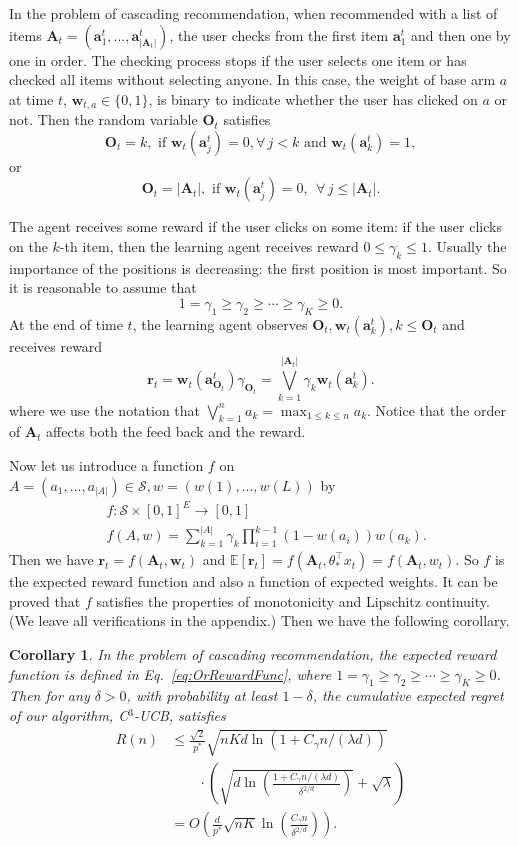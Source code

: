 \documentclass{article}
\newcommand{\EE}{\mathbb{E}}
\newcommand{\bA}{\mathbf{A}}
\newcommand{\ba}{\mathbf{a}}
\newcommand{\bO}{\mathbf{O}}
\newcommand{\br}{\mathbf{r}}
\newcommand{\bw}{\mathbf{w}}
\newcommand{\cS}{\mathcal{S}}
\newcommand{\abs}[1]{\left| #1 \right|}
\newtheorem{corollary}[theorem]{Corollary}%
\begin{document}
In the problem of cascading recommendation, when recommended with a list of items $\bA_t = (\ba_{1}^t,...,\ba_{\abs{\bA_t}}^t)$, the user checks from the first item $\ba_{1}^t$ and then one by one in order. The checking process stops if the user selects one item or has checked all items without selecting anyone. In this case, the weight of base arm $a$ at time $t$, $\bw_{t,a} \in \{ 0, 1 \}$, is binary to indicate whether the user has clicked on $a$ or not. Then the random variable $\bO_t$ satisfies
$$
\bO_t = k, \text{ if } \bw_t(\ba_j^t)=0, \forall\, j < k \text{ and } \bw_t(\ba_k^t) = 1,
$$
or 
$$
\bO_t = \abs{\bA_t}, \text{ if }\bw_t(\ba_j^t) = 0, ~~ \forall\, j \leq \abs{\bA_t}.
$$

The agent receives some reward if the user clicks on some item: if the user clicks on the $k$-th item, then the learning agent receives reward $0 \leq \gamma_k \leq 1$. Usually the importance of the positions is decreasing: the first position is most important. So it is reasonable to assume that
$$
1 = \gamma_1 \geq \gamma_2 \geq \cdots \geq \gamma_K \geq 0.
$$
At the end of time $t$, the learning agent observes $\bO_t, \bw_t(\ba_k^t), k \leq \bO_t$ and receives reward
$$
\br_t = \bw_t(\ba_{\bO_t}^t) \gamma_{\bO_t} = \bigvee_{k=1}^{\abs{\bA_t}} \gamma_k \bw_t(\ba_k^t).
$$
where we use the notation that $\bigvee_{k=1}^n a_k = \max_{1 \leq k \leq n} a_k$. Notice that the order of $\bA_t$ affects both the feed back and the reward.

Now let us introduce a function $f$ on $A = (a_1,...,a_{\abs{A}}) \in \cS, w = (w(1),...,w(L))$ by
\begin{align}
&f : \cS \times [0,1]^E \to [0,1] \nonumber \\
&f(A,w) = \sum_{k = 1}^{\abs{A}} \gamma_{k} \prod_{i=1}^{k-1} (1 - w(a_i)) w(a_k). \label{eq:OrRewardFunc}
\end{align}
Then we have $\br_t = f(\bA_t, \bw_t)$ and $\EE[\br_t] = f(\bA_t, \theta_{\ast}^{\top}x_t) = f(\bA_t, w_t)$. So $f$ is the expected reward function and also a function of expected weights. It can be proved that $f$ satisfies the properties of monotonicity and Lipschitz continuity. (We leave all verifications in the appendix.) Then we have the following corollary.
\begin{corollary}
	\label{cor:or}
	In the problem of cascading recommendation, the expected reward function is defined in Eq.~\eqref{eq:OrRewardFunc}, where $1 = \gamma_1 \geq \gamma_2 \geq \cdots \geq \gamma_K \geq 0$. Then for any $\delta > 0$, with probability at least $1 - \delta$, the cumulative expected regret of our algorithm, C$^3$-UCB, satisfies
	\begin{align}
		R(n) &\le \frac{\sqrt{2}}{p^*} \sqrt{nKd\ln(1 + C_\gamma n/(\lambda d))}  \nonumber \\
		&\qquad \cdot \left(\sqrt{d\ln \left( \frac{1 + C_\gamma n/(\lambda d)}{\delta^{2/d}}\right) } + \sqrt{\lambda}\right) \nonumber \\
		&=O\left(\frac{d}{p^*} \sqrt{nK} \ln \left(\frac{C_\gamma n}{\delta^{2/d}}\right) \right).
	\end{align}
\end{corollary}
\end{document}
